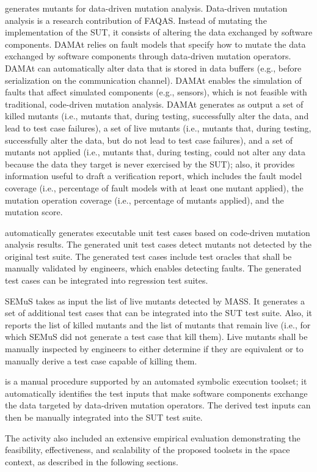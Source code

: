  generates mutants for data-driven mutation analysis. Data-driven mutation analysis is a research contribution of FAQAS. Instead of mutating the implementation of the SUT, it consists of altering the data exchanged by software components. 
DAMAt relies on fault models that specify how to mutate the data exchanged by software components through data-driven mutation operators. DAMAt can automatically alter data that is stored in data buffers (e.g., before serialization on the communication channel).
DAMAt enables the simulation of faults that affect simulated components (e.g., sensors), which is not feasible with traditional, code-driven mutation analysis. 
DAMAt generates as output a set of killed mutants (i.e., mutants that, during testing, successfully alter the data, and lead to test case failures), a set of live mutants (i.e., mutants that, during testing, successfully alter the data, but do not lead to test case failures), and a set of mutants not applied (i.e., mutants that, during testing, could not alter any data because the data they target is never exercised by the SUT); also, it provides information useful to draft a verification report, which includes the fault model coverage (i.e., percentage of fault models with at least one mutant applied), the mutation operation coverage (i.e., percentage of mutants applied), and the mutation score.

 automatically generates executable unit test cases based on code-driven mutation analysis results. The generated unit test cases detect mutants not detected by the original test suite. The generated test cases include test oracles that shall be manually validated by engineers, which enables detecting faults. The generated test cases can be integrated into regression test suites.

SEMuS takes as input the list of live mutants detected by MASS. It generates a set of additional test cases that can be integrated into the SUT test suite. Also, it reports the list of killed mutants and the list of mutants that remain live (i.e., for which SEMuS did not generate a test case that kill them). Live mutants shall be manually inspected by engineers to either determine if they are equivalent or to manually derive a test case capable of killing them.

 is a manual procedure supported by an automated symbolic execution toolset; it automatically identifies the test inputs that make software components exchange the data targeted by data-driven mutation operators. The derived test inputs can then be manually integrated into the SUT test suite.
 
The activity also included an extensive empirical evaluation demonstrating the feasibility, effectiveness, and scalability of the proposed toolsets in the space context, as described in the following sections.